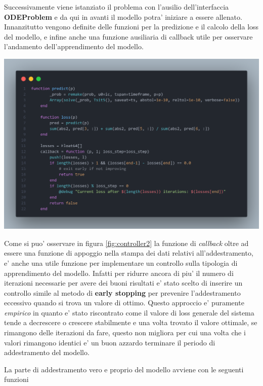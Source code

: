 Successivamente viene istanziato il problema con l'ausilio dell'interfaccia \textbf{ODEProblem} e da qui in avanti il modello potra' iniziare a 
essere allenato. Innanzitutto vengono definite delle funzioni per la predizione e il calcolo della loss del modello, 
e infine anche una funzione ausiliaria di callback utile per osservare l'andamento dell'apprendimento del modello.

\begin{minipage}{\linewidth}
	\centering
	\includegraphics[width=\textwidth]{img/controller2.png}
	\label{fig:controller2}
\end{minipage}

Come si puo' osservare in figura \ref{fig:controller2} la funzione di \emph{callback} oltre ad essere una funzione di 
appoggio nella stampa dei dati relativi all'addestramento, e' anche una utile funzione per implementare un controllo sulla tipologia 
di apprendimento del modello. Infatti per ridurre ancora di piu' il numero di iterazioni necessarie per avere dei buoni risultati 
e' stato scelto di inserire un controllo simile al metodo di \textbf{early stopping} \cite{wiki:Early_stopping} per prevenire 
l'addestramento eccessivo quando si trova un valore di ottimo. Questo approccio e' puramente \emph{empirico} in quanto 
e' stato riscontrato come il valore di loss generale del sistema tende a decrescere o crescere stabilmente e una volta trovato il 
valore ottimale, se rimangono delle iterazioni da fare, questo non migliora per cui una volta che i valori rimangono identici 
e' un buon azzardo terminare il periodo di addestramento del modello.

La parte di addestramento vero e proprio del modello avviene con le seguenti funzioni

